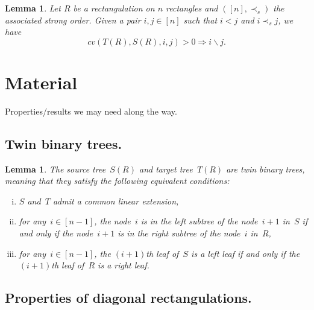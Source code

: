 \documentclass{amsart}
\newtheorem{lemma}[theorem]{Lemma}
\theoremstyle{definition}
\renewcommand{\implies}{\Rightarrow} %
\newcommand{\darkblue}{\color{darkblue}} %
\newcommand{\defn}[1]{\textsl{\darkblue #1}} %
\begin{document}
\begin{lemma}
  Let $R$ be a rectangulation on $n$ rectangles and $([n],\prec_s)$ the associated strong order.
  Given a pair $i,j\in [n]$ such that $i<j$ and $i\prec_s j$, we have
  \[
    cv (T(R), S(R), i, j) > 0 \implies i\backslash j.
  \]
\end{lemma}



{}


\label{sec:biblio}


\newpage
\appendix
\section{Material}

Properties/results we may need along the way.

\subsection{Twin binary trees.}

\begin{lemma}
The source tree~$S(R)$ and target tree~$T(R)$ are \defn{twin binary trees}, meaning that they satisfy the following equivalent conditions:
\begin{enumerate}[(i)]
\item $S$ and~$T$ admit a common linear extension,
\item for any~$i \in [n-1]$, the node~$i$ is in the left subtree of the node~$i+1$ in~$S$ if and only if the node~$i+1$ is in the right subtree of the node~$i$ in~$R$,
\item for any~$i \in [n-1]$, the $(i+1)$th leaf of~$S$ is a left leaf if and only if the $(i+1)$th leaf of~$R$ is a right leaf.
\end{enumerate}
\end{lemma}

\subsection{Properties of diagonal rectangulations.}
\end{document}
